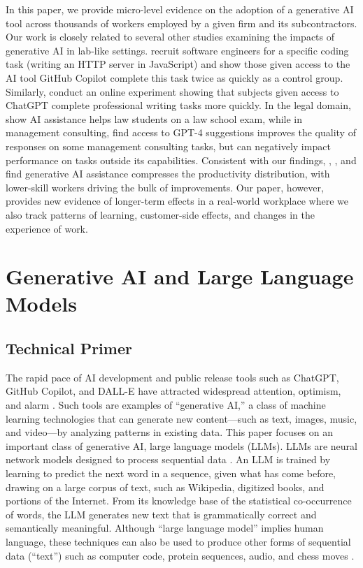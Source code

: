 \documentclass[11pt]{article}
\begin{document}
In this paper, we provide micro-level evidence on the adoption of a generative AI tool across thousands of workers employed by a given firm and its subcontractors.  Our work is closely related to several other studies examining the impacts of generative AI in lab-like settings.  \citet{peng2023impact} recruit software engineers for a specific coding task (writing an HTTP server in JavaScript) and show those given access to the AI tool GitHub Copilot complete this task twice as quickly as a control group. Similarly, \citet{noyExperimentalEvidenceProductivity2023} conduct an online experiment showing that subjects given access to ChatGPT complete professional writing tasks more quickly. In the legal domain, \citet{choiAIAssistanceLegal2023} show AI assistance helps law students on a law school exam, while in management consulting, \citet{dellacquaNavigatingJaggedTechnological2023} find access to GPT-4 suggestions improves the quality of responses on some management consulting tasks, but can negatively impact performance on tasks outside its capabilities. Consistent with our findings, \citet{noyExperimentalEvidenceProductivity2023}, 
\citet{choiAIAssistanceLegal2023}, \citet{peng2023check} and \citet{dellacquaNavigatingJaggedTechnological2023} find generative AI assistance compresses the productivity distribution, with lower-skill workers driving the bulk of improvements. Our paper, however, provides new evidence of longer-term effects in a real-world workplace where we also track patterns of learning, customer-side effects, and changes in the experience of work.  


\section{Generative AI and Large Language Models}

\subsection{Technical Primer}

The rapid pace of AI development and public release tools such as ChatGPT, GitHub Copilot, and DALL-E have attracted widespread attention, optimism, and alarm \citep{whitehouse2022}.  Such tools are examples of ``generative AI,'' a class of machine learning technologies that can generate new content---such as text, images, music, and video---by analyzing patterns in existing data. This paper focuses on an important class of generative AI, large language models (LLMs). LLMs are neural network models designed to process sequential data \citep{bubeck2023sparks}.  An LLM is trained by learning to predict the next word in a sequence, given what has come before, drawing on a large corpus of text, such as Wikipedia, digitized books, and portions of the Internet. From its knowledge base of the statistical co-occurrence of words, the LLM generates new text that is grammatically correct and semantically meaningful.  Although ``large language model'' implies human language, these techniques can also be used to produce other forms of sequential data (``text'') such as computer code, protein sequences, audio, and chess moves \citep{el2023}. 
\end{document}
